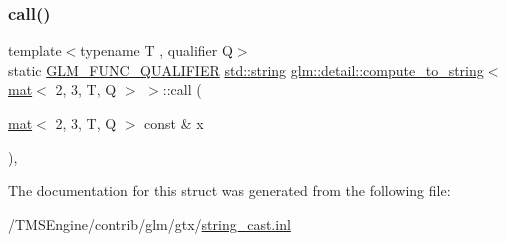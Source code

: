 \subsubsection{\texorpdfstring{call()}{call()}}
{\footnotesize\ttfamily template$<$typename T , qualifier Q$>$ \\
static \hyperlink{setup_8hpp_a33fdea6f91c5f834105f7415e2a64407}{G\+L\+M\+\_\+\+F\+U\+N\+C\+\_\+\+Q\+U\+A\+L\+I\+F\+I\+ER} \hyperlink{_s_d_l__opengl__glext_8h_ae84541b4f3d8e1ea24ec0f466a8c568b}{std\+::string} \hyperlink{structglm_1_1detail_1_1compute__to__string}{glm\+::detail\+::compute\+\_\+to\+\_\+string}$<$ \hyperlink{structglm_1_1mat}{mat}$<$ 2, 3, T, Q $>$ $>$\+::call (\begin{DoxyParamCaption}\item[{\hyperlink{structglm_1_1mat}{mat}$<$ 2, 3, T, Q $>$ const \&}]{x }\end{DoxyParamCaption})\hspace{0.3cm}{\ttfamily [inline]}, {\ttfamily [static]}}



The documentation for this struct was generated from the following file\+:\begin{DoxyCompactItemize}
\item 
/\+T\+M\+S\+Engine/contrib/glm/gtx/\hyperlink{string__cast_8inl}{string\+\_\+cast.\+inl}\end{DoxyCompactItemize}
